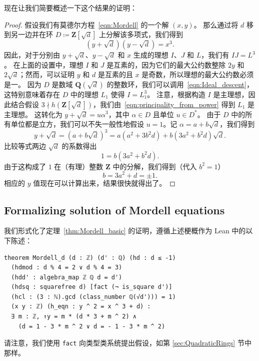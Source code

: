 \documentclass[sigplan,10pt,nonacm,
screen]{acmart} \settopmatter{printfolios=true,printccs=false,printacmref=false}
\newcommand{\QQ}{\mathbf{Q}}
\newcommand{\ZZ}{\mathbf{Z}}
\begin{document}
现在让我们简要概述一下这个结果的证明：
\begin{proof}
假设我们有莫德尔方程~\eqref{eqn:Mordell} 的一个解 $(x,y)$。
那么通过将 $d$ 移到另一边并在环 $D\coloneqq \ZZ[\sqrt{d}]$ 上分解该多项式，我们得到
\[(y+\sqrt{d})(y-\sqrt{d})=x^3.\]
因此，对于分别由 $y+\sqrt{d}$、$y-\sqrt{d}$ 和 $x$ 生成的理想 $I$、$J$ 和 $L$，我们有 $IJ=L^3$。
在上面的设置中，理想 $I$ 和 $J$ 是互素的，因为它们的最大公约数整除 $2y$ 和 $2\sqrt{d}$；然而，可以证明 $y$ 和 $d$ 是互素的且 $x$ 是奇数，所以理想的最大公约数必须是一。
因为 $D$ 是数域 $\QQ(\sqrt{d})$ 的整数环，我们可以调用~\eqref{eqn:Ideal_descent}，这特别意味着存在 $D$ 中的理想 $L_1$ 使得 $I=L_1^3$。
注意，根据构造 $I$ 是主理想，因此结合假设 $3\nmid h(\ZZ[\sqrt{d}])$，我们由~\eqref{eqn:principality_from_power} 得到 $L_1$ 是主理想。
这转化为
$y+\sqrt{d}=u \alpha^3$，其中 $\alpha \in D$ 且单位 $u \in D^*$。
由于 $D$ 中的所有单位都是立方，我们可以不失一般性地假设 $u=1$。记 $\alpha=a+b\sqrt{d}$，我们得到
\[y+\sqrt{d}=(a+b\sqrt{d})^3=a(a^2+3b^2d)+b(3a^2+b^2d)\sqrt{d}.\]
比较等式两边 $\sqrt{d}$ 的系数得出
\[1=b(3a^2+b^2d).\]
由于这构成了 $1$ 在（有理）整数 $\ZZ$ 中的分解，我们得到（代入 $b^2=1$）
\[b=3a^2+d=\pm 1.\]%
相应的 $y$ 值现在可以计算出来，结果很快就得出了。
\end{proof}

\subsection{Formalizing solution of Mordell equations}

我们形式化了定理~\ref{thm:Mordell_basic} 的证明，遵循上述梗概作为 Lean 中的以下陈述：
\begin{lstlisting}
theorem Mordell_d (d : ℤ) (d' : ℚ) (hd : d ≤ -1)
  (hdmod : d % 4 = 2 ∨ d % 4 = 3)
  (hdd' : algebra_map ℤ ℚ d = d')
  (hdsq : squarefree d) [fact (¬ is_square d')]
  (hcl : (3 : ℕ).gcd (class_number ℚ(√d'))) = 1)
  (x y : ℤ) (h_eqn : y ^ 2 = x ^ 3 + d) :
  ∃ m : ℤ, ↑y = m * (d * 3 + m ^ 2) ∧
    (d = 1 - 3 * m ^ 2 ∨ d = - 1 - 3 * m ^ 2)
\end{lstlisting}

请注意，我们使用 \lstinline{fact} 向类型类系统提出假设，如第 \ref{sec:QuadraticRings} 节中那样。
\end{document}
